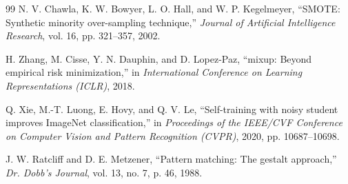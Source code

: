 \documentclass[conference]{IEEEtran}
\begin{document}
\begin{thebibliography}{99}
 N. V. Chawla, K. W. Bowyer, L. O. Hall, and W. P. Kegelmeyer, ``SMOTE: Synthetic minority
over-sampling technique,'' \emph{Journal of Artificial Intelligence Research}, vol. 16, pp. 321--357, 2002.

 H. Zhang, M. Cisse, Y. N. Dauphin, and D. Lopez-Paz, ``mixup: Beyond empirical risk
minimization,'' in \emph{International Conference on Learning Representations (ICLR)}, 2018.

 Q. Xie, M.-T. Luong, E. Hovy, and Q. V. Le, ``Self-training with noisy student improves ImageNet
classification,'' in \emph{Proceedings of the IEEE/CVF Conference on Computer Vision and Pattern Recognition
(CVPR)}, 2020, pp. 10687--10698.

 J. W. Ratcliff and D. E. Metzener, ``Pattern matching: The gestalt approach,'' \emph{Dr.
Dobb's Journal}, vol. 13, no. 7, p. 46, 1988.

\end{thebibliography}
\end{document}
